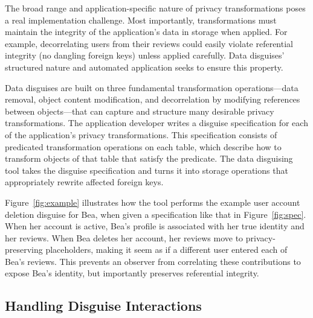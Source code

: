 %
The broad range and application-specific nature of privacy transformations poses a real
implementation challenge.
%
Most importantly, transformations must maintain the integrity of the application's data
in storage when applied.
%
For example, decorrelating users from their reviews could easily violate referential
integrity (\ie no dangling foreign keys) unless applied carefully.
%
%
Data disguises' structured nature and automated application seeks to ensure this
property.
%

%
Data disguises are built on three fundamental transformation operations---data removal, object content
modification, and decorrelation by modifying references between objects---that can
capture and structure many desirable privacy transformations.
%
The application developer writes a disguise specification for each of the application's
privacy transformations.
%
This specification consists of predicated transformation operations on each table, which describe
how to transform objects of that table that satisfy the predicate.
%
The data disguising tool takes the disguise specification and turns it into storage
operations that appropriately rewrite affected foreign keys.
%

%
Figure~\ref{fig:example} illustrates how the tool performs the example user
account deletion disguise for Bea, when given a specification like that in Figure~\ref{fig:spec}.
%
When her account is active, Bea's profile is associated with her true identity and her
reviews.
%
When Bea deletes her account, her reviews move to privacy-preserving
placeholders, making it seem as if a different user entered each of Bea's reviews.
%
This prevents an observer from correlating these contributions to expose Bea's identity,
but importantly preserves referential integrity.
%

%
%
%

\subsection{Handling Disguise Interactions}


